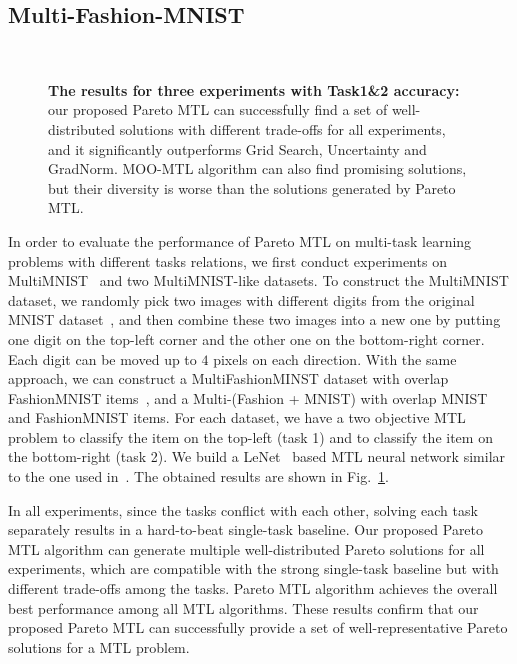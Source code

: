 \subsection{Multi-Fashion-MNIST}

\begin{figure}[H]
\centering
{}
 \\
\caption{\textbf{The results for three experiments with Task1\&2 accuracy:} our proposed Pareto MTL can successfully find a set of well-distributed solutions with different trade-offs for all experiments, and it significantly outperforms Grid Search, Uncertainty and GradNorm. MOO-MTL algorithm can also find promising solutions, but their diversity is worse than the solutions generated by Pareto MTL. }

\label{mnist_results}
\end{figure}

In order to evaluate the performance of Pareto MTL on multi-task learning problems with different tasks relations, we first conduct experiments on MultiMNIST~\cite{sabour2017dynamic} and two MultiMNIST-like datasets. To construct the MultiMNIST dataset, we randomly pick two images with different digits from the original MNIST dataset~\cite{lecun1998gradient}, and then combine these two images into a new one by putting one digit on the top-left corner and the other one on the bottom-right corner. Each digit can be moved up to $4$ pixels on each direction. With the same approach, we can construct a MultiFashionMINST dataset with overlap FashionMNIST items~\cite{xiao2017fashion}, and a Multi-(Fashion + MNIST) with overlap MNIST and FashionMNIST items.  For each dataset, we have a two objective MTL problem to classify the item on the top-left (task 1) and to classify the item on the bottom-right (task 2). We build a LeNet~\cite{lecun1998gradient} based MTL neural network similar to the one used in~\cite{sener2018multi}. The obtained results are shown in Fig.~\ref{mnist_results}.

In all experiments, since the tasks conflict with each other, solving each task separately results in a hard-to-beat single-task baseline. Our proposed Pareto MTL algorithm can generate multiple well-distributed Pareto solutions for all experiments, which are compatible with the strong single-task baseline but with different trade-offs among the tasks. Pareto MTL algorithm achieves the overall best performance among all MTL algorithms. These results confirm that our proposed Pareto MTL can successfully provide a set of well-representative Pareto solutions for a MTL problem.

